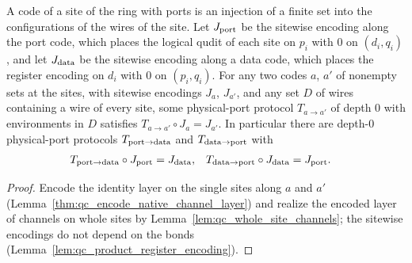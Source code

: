 \begin{lemma}
    \label{thm:qc_physical_port_codes}
    \leanok
    A code of a site of the ring with ports is an injection of a finite set into the
    configurations of the wires of the site. Let $J_{\rm port}$ be the sitewise encoding along
    the port code, which places the logical qudit of each site on $p_i$ with $0$ on $(d_i,q_i)$,
    and let $J_{\rm data}$ be the sitewise encoding along a data code, which places the register
    encoding on $d_i$ with $0$ on $(p_i,q_i)$. For any two codes $a$, $a'$ of nonempty sets at
    the sites, with sitewise encodings $J_a$, $J_{a'}$, and any set $D$ of wires containing a
    wire of every site, some physical-port protocol $T_{a\to a'}$ of depth $0$ with environments
    in $D$ satisfies $T_{a\to a'}\circ J_a=J_{a'}$. In particular there are depth-$0$
    physical-port protocols $T_{{\rm port}\to{\rm data}}$ and $T_{{\rm data}\to{\rm port}}$ with
    \begin{align}
        T_{{\rm port}\to{\rm data}}\circ J_{\rm port} & =J_{\rm data},       &
        T_{{\rm data}\to{\rm port}}\circ J_{\rm data} & =J_{\rm port}.\notag
    \end{align}
\end{lemma}
\begin{proof}
    \leanok
    Encode the identity layer on the single sites along $a$ and $a'$
    (Lemma~\ref{thm:qc_encode_native_channel_layer}) and realize the encoded layer of channels on
    whole sites by Lemma~\ref{lem:qc_whole_site_channels}; the sitewise encodings do not depend on
    the bonds (Lemma~\ref{lem:qc_product_register_encoding}).
\end{proof}

